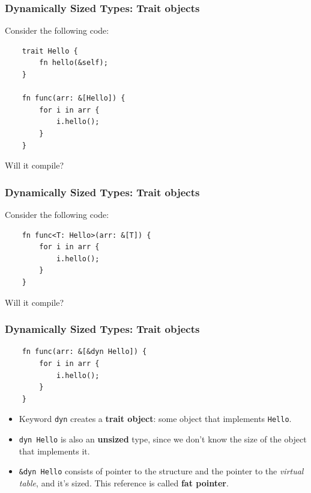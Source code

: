 \documentclass[aspectratio=1610,t]{beamer}
\begin{document}

\begin{frame}[fragile]
\frametitle{Dynamically Sized Types: Trait objects}
Consider the following code:

\begin{verbatim}
    trait Hello {
        fn hello(&self);
    }

    fn func(arr: &[Hello]) {
        for i in arr {
            i.hello();
        }
    }
\end{verbatim}

Will it compile?

\end{frame}


\begin{frame}[fragile]
\frametitle{Dynamically Sized Types: Trait objects}
Consider the following code:

\begin{verbatim}
    fn func<T: Hello>(arr: &[T]) {
        for i in arr {
            i.hello();
        }
    }
\end{verbatim}

Will it compile?


\end{frame}


\begin{frame}[fragile]
\frametitle{Dynamically Sized Types: Trait objects}
\begin{verbatim}
    fn func(arr: &[&dyn Hello]) {
        for i in arr {
            i.hello();
        }
    }
\end{verbatim}

\begin{itemize}[leftmargin=0pt]
    \item<2-> Keyword \texttt{dyn} creates a \textbf{trait object}: some object that implements \texttt{Hello}.
    \item<3-> \texttt{dyn Hello} is also an \textbf{unsized} type, since we don't know the size of the object that implements it.
    \item<4-> \texttt{\&dyn Hello} consists of pointer to the structure and the pointer to the \textit{virtual table}, and it's sized. This reference is called \textbf{fat pointer}.
\end{itemize}
\end{frame}
\end{document}
